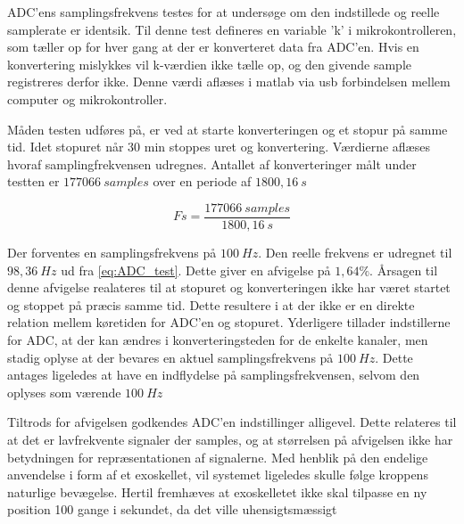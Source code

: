 ADC'ens samplingsfrekvens testes for at undersøge om den indstillede og reelle samplerate er identsik. Til denne test defineres en variable 'k' i mikrokontrolleren, som tæller op for hver gang at der er konverteret data fra ADC'en. Hvis en konvertering mislykkes vil k-værdien ikke tælle op, og den givende sample registreres derfor ikke. Denne værdi aflæses i matlab via usb forbindelsen mellem computer og mikrokontroller. 

Måden testen udføres på, er ved at starte konverteringen og et stopur på samme tid. Idet stopuret når 30 min stoppes uret og konvertering. Værdierne aflæses hvoraf samplingfrekvensen udregnes. Antallet af konverteringer målt under testten er $177066~samples$ over en periode af $1800,16~s$

\begin{equation}\label{eq:ADC_test}
Fs = \frac{177066~samples}{1800,16~s}
\end{equation}

Der forventes en samplingsfrekvens på $100~Hz$. Den reelle frekvens er udregnet til $98,36~Hz$ ud fra \autoref{eq:ADC_test}. Dette giver en afvigelse på $1,64\%$. Årsagen til denne afvigelse realateres til at stopuret og konverteringen ikke har været startet og stoppet på præcis samme tid. Dette resultere i at der ikke er en direkte relation mellem køretiden for ADC'en og stopuret. Yderligere tillader indstillerne for ADC, at der kan ændres i konverteringsteden for de enkelte kanaler, men stadig oplyse at der bevares en aktuel samplingsfrekvens på $100~Hz$. Dette antages ligeledes at have en indflydelse på samplingsfrekvensen, selvom den oplyses som værende $100~Hz$ 

Tiltrods for afvigelsen godkendes ADC'en indstillinger alligevel. Dette relateres til at det er lavfrekvente signaler der samples, og at størrelsen på afvigelsen ikke har betydningen for repræsentationen af signalerne. 
Med henblik på den endelige anvendelse i form af et exoskellet, vil systemet ligeledes skulle følge kroppens naturlige bevægelse. Hertil fremhæves at exoskelletet ikke skal tilpasse en ny position 100 gange i sekundet, da det ville uhensigtsmæssigt

